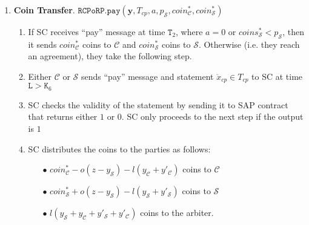 \begin{enumerate}
\begin{enumerate}
\end{enumerate} %

\

\item \textbf{Coin Transfer}. \label{RCPoRP::CoinTransfer} $\mathtt{RCPoRP}.\mathtt{pay}(\bm{y},T_{\scriptscriptstyle cp},a,p_{\scriptscriptstyle\mathcal S}, coin^{\scriptscriptstyle *}_{\scriptscriptstyle\mathcal C},coin^{\scriptscriptstyle *}_{\scriptscriptstyle\mathcal S})$
\begin{enumerate}


 \item If SC  receives  ``pay'' message  at time $\texttt{T}_{\scriptscriptstyle 2}$, where $a=0$ or $coins^{\scriptscriptstyle *}_{\scriptscriptstyle\mathcal{S}}<p_{\scriptscriptstyle\mathcal{S}}$, then it sends $coin^{\scriptscriptstyle *}_{\scriptscriptstyle\mathcal C}$ coins to $\mathcal C$ and $coin^{\scriptscriptstyle *}_{\scriptscriptstyle\mathcal S}$ coins to $\mathcal S$. Otherwise (i.e. they reach an agreement), they take the following step. 

\item Either $\mathcal C$ or $\mathcal S$ sends ``pay'' message and  statement $\ddot{x}_{\scriptscriptstyle cp}\in T_{\scriptscriptstyle cp}$ to SC at time $\texttt{L}>\texttt{K}_{\scriptscriptstyle 6}$
\item SC checks the validity of the statement by sending it  to SAP contract that  returns  either $1$ or $0$. SC only proceeds to the next step if the output is $1$
\item SC distributes the coins to the parties as follows:

\begin{itemize}
\item[$\bullet$]   $coin^{\scriptscriptstyle *}_{\scriptscriptstyle\mathcal C}-o(z-y_{\scriptscriptstyle\mathcal S})-l(y_{\scriptscriptstyle\mathcal C}+y'_{\scriptscriptstyle\mathcal C})$ coins  to $\mathcal C$
\item[$\bullet$] $coin^{\scriptscriptstyle *}_{\scriptscriptstyle\mathcal S}+o(z-y_{\scriptscriptstyle\mathcal S})-l(y_{\scriptscriptstyle\mathcal S}+y'_{\scriptscriptstyle\mathcal S})$ coins to $\mathcal S$
\item[$\bullet$] $l(y_{\scriptscriptstyle\mathcal S}+y_{\scriptscriptstyle\mathcal C}+y'_{\scriptscriptstyle\mathcal S}+y'_{\scriptscriptstyle\mathcal C})$ coins to the arbiter. 


%
\end{itemize}


\end{enumerate}
\end{enumerate}
